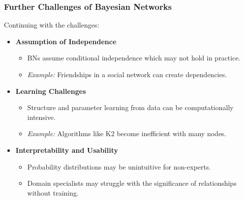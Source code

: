 \documentclass[aspectratio=169]{beamer}
\begin{document}
\begin{frame}[fragile]
    \frametitle{Further Challenges of Bayesian Networks}
    
    Continuing with the challenges:
    
    \begin{itemize}
        \item \textbf{Assumption of Independence}
        \begin{itemize}
            \item BNs assume conditional independence which may not hold in practice.
            \item \emph{Example:} Friendships in a social network can create dependencies.
        \end{itemize}
        
        \item \textbf{Learning Challenges}
        \begin{itemize}
            \item Structure and parameter learning from data can be computationally intensive.
            \item \emph{Example:} Algorithms like K2 become inefficient with many nodes.
        \end{itemize}
        
        \item \textbf{Interpretability and Usability}
        \begin{itemize}
            \item Probability distributions may be unintuitive for non-experts.
            \item Domain specialists may struggle with the significance of relationships without training.
        \end{itemize}
    \end{itemize}
\end{frame}
\end{document}
